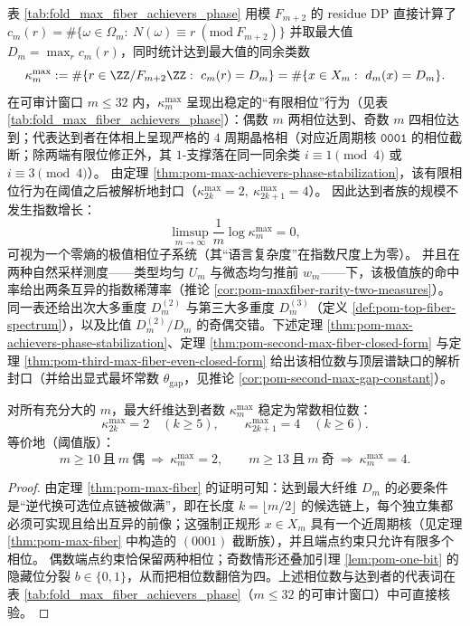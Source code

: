 \begin{remark}\label{rem:pom-max-fiber-achievers-phase}
表 \ref{tab:fold_max_fiber_achievers_phase} 用模 \(F_{m+2}\) 的 residue DP 直接计算了
\(
c_m(r)=\#\{\omega\in\Omega_m:\ N(\omega)\equiv r\ (\mathrm{mod}\ F_{m+2})\}
\)
并取最大值 \(D_m=\max_r c_m(r)\)，同时统计达到最大值的同余类数
\[
\kappa_m^{\mathrm{max}}:=\#\{r\in\ZZ/F_{m+2}\ZZ:\ c_m(r)=D_m\}
=\#\{x\in X_m:\ d_m(x)=D_m\}.
\]
在可审计窗口 \(m\le 32\) 内，\(\kappa_m^{\mathrm{max}}\) 呈现出稳定的“有限相位”行为（见表 \ref{tab:fold_max_fiber_achievers_phase}）：偶数 \(m\) 两相位达到、奇数 \(m\) 四相位达到；代表达到者在体相上呈现严格的 \(4\) 周期晶格相（对应近周期核 \(\texttt{0001}\) 的相位截断；除两端有限位修正外，其 \(1\)-支撑落在同一同余类 \(i\equiv 1\pmod 4\) 或 \(i\equiv 3\pmod 4\)）。
由定理 \ref{thm:pom-max-achievers-phase-stabilization}，该有限相位行为在阈值之后被解析地封口（\(\kappa_{2k}^{\mathrm{max}}=2,\ \kappa_{2k+1}^{\mathrm{max}}=4\)）。
因此达到者族的规模不发生指数增长：
\[
\limsup_{m\to\infty}\frac{1}{m}\log \kappa_m^{\mathrm{max}}=0,
\]
可视为一个零熵的极值相位子系统（其“语言复杂度”在指数尺度上为零）。
并且在两种自然采样测度——类型均匀 \(U_m\) 与微态均匀推前 \(w_m\)——下，该极值族的命中率给出两条互异的指数稀薄率（推论 \ref{cor:pom-maxfiber-rarity-two-measures}）。
同一表还给出次大多重度 \(D_m^{(2)}\) 与第三大多重度 \(D_m^{(3)}\)（定义 \ref{def:pom-top-fiber-spectrum}），以及比值 \(D_m^{(2)}/D_m\) 的奇偶交错。下述定理 \ref{thm:pom-max-achievers-phase-stabilization}、定理 \ref{thm:pom-second-max-fiber-closed-form} 与定理 \ref{thm:pom-third-max-fiber-even-closed-form} 给出该相位数与顶层谱缺口的解析封口（并给出显式最坏常数 \(\theta_{\mathrm{gap}}\)，见推论 \ref{cor:pom-second-max-gap-constant}）。
\end{remark}

\begin{theorem}[最大纤维达到者的相位数稳定化]\label{thm:pom-max-achievers-phase-stabilization}
对所有充分大的 \(m\)，最大纤维达到者数 \(\kappa_m^{\mathrm{max}}\) 稳定为常数相位数：
\[
\kappa_{2k}^{\mathrm{max}}=2\quad(k\ge 5),
\qquad
\kappa_{2k+1}^{\mathrm{max}}=4\quad(k\ge 6).
\]
等价地（阈值版）：
\[
m\ge 10\ \text{且}\ m\ \text{偶}\ \Rightarrow\ \kappa_m^{\mathrm{max}}=2,
\qquad
m\ge 13\ \text{且}\ m\ \text{奇}\ \Rightarrow\ \kappa_m^{\mathrm{max}}=4.
\]
\end{theorem}
\begin{proof}
由定理 \ref{thm:pom-max-fiber} 的证明可知：达到最大纤维 \(D_m\) 的必要条件是“逆代换可选位点链被做满”，即在长度 \(k=\lfloor m/2\rfloor\) 的候选链上，每个独立集都必须可实现且给出互异的前像；这强制正规形 \(x\in X_m\) 具有一个近周期核（见定理 \ref{thm:pom-max-fiber} 中构造的 \((0001)\) 截断族），并且端点约束只允许有限多个相位。
偶数端点约束恰保留两种相位；奇数情形还叠加引理 \ref{lem:pom-one-bit} 的隐藏位分裂 \(b\in\{0,1\}\)，从而把相位数翻倍为四。上述相位数与达到者的代表词在表 \ref{tab:fold_max_fiber_achievers_phase}（\(m\le 32\) 的可审计窗口）中可直接核验。
\end{proof}

